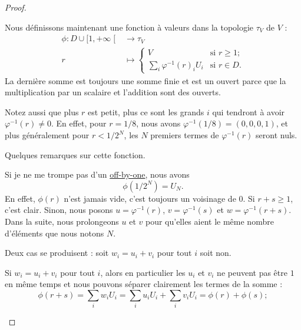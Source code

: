 \begin{proof}
\begin{subproof}
		Nous définissons maintenant une fonction à valeurs dans la topologie \( \tau_V\) de \( V\) :
		\begin{equation}
			\begin{aligned}
				\phi\colon D\cup\mathopen[ 1 , +\infty \mathclose[ & \to \tau_V \\
				r                                                  & \mapsto
				\begin{cases}
					V                          & \text{si } r \geq 1; \\
					\sum_i\varphi^{-1}(r)_iU_i & \text{si } r\in D.
				\end{cases}
			\end{aligned}
		\end{equation}
		La dernière somme est toujours une somme finie et est un ouvert parce que la multiplication par un scalaire et l'addition sont des ouverts.

		Notez aussi que plus \( r\) est petit, plus ce sont les grands \( i\) qui tendront à avoir \( \varphi^{-1}(r)\neq 0\). En effet, pour \( r=1/8\), nous avons \( \varphi^{-1}(1/8)=(0,0,0,1)\), et plus généralement pour \( r<1/2^N\), les \( N\) premiers termes de \( \varphi^{-1}(r)\) seront nuls.

		Quelques remarques sur cette fonction.
		\begin{subproof}
			 Si je ne me trompe pas d'un \href{https://fr.wikipedia.org/wiki/Erreur_off-by-one }{off-by-one}, nous avons
			\begin{equation}
				\phi(1/2^N)=U_N.
			\end{equation}
			En effet, \(\phi(r)\) n'est jamais vide, c'est toujours un voisinage de \(0\).
			Si \(r + s \geq 1 \), c'est clair. Sinon, nous posons \( u=\varphi^{-1}(r)\), \( v=\varphi^{-1}(s)\) et \( w=\varphi^{-1}(r+s)\). Dans la suite, nous prolongeons \( u\) et \( v\) pour qu'elles aient le même nombre d'éléments que nous notons \( N\).

			Deux cas se produisent : soit \( w_i=u_i+v_i\) pour tout \( i\) soit non.

			\begin{subproof}
				Si \( w_i=u_i+v_i\) pour tout \( i\), alors en particulier les \( u_i\) et \( v_i\) ne peuvent pas être \( 1\) en même temps et nous pouvons séparer clairement les termes de la somme :
				\begin{equation}
					\phi(r+s) = \sum_i w_i U_i = \sum_i u_i U_i + \sum_i v_i U_i = \phi(r) + \phi(s);
				\end{equation}


\end{subproof}
\end{subproof}
\end{subproof}
\end{proof}
